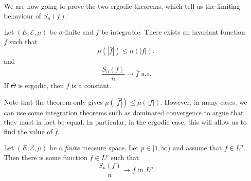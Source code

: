 \documentclass[a4paper]{article}
\begin{document}
We are now going to prove the two ergodic theorems, which tell us the limiting behaviour of $S_n(f)$.

\begin{thm}
  Let $(E, \mathcal{E}, \mu)$ be $\sigma$-finite and $f$ be integrable. There exists an invariant function $\bar{f}$ such that
  \[
    \mu(|\bar{f}|) \leq \mu(|f|),
  \]
  and
  \[
    \frac{S_n(f)}{n} \to \bar{f}\text{ a.e.}
  \]
  If $\Theta$ is ergodic, then $\bar{f}$ is a constant.
\end{thm}
Note that the theorem only gives $\mu(|\bar{f}|) \leq \mu(|f|)$. However, in many cases, we can use some integration theorems such as dominated convergence to argue that they must in fact be equal. In particular, in the ergodic case, this will allow us to find the value of $\bar{f}$.

\begin{thm}
  Let $(E, \mathcal{E}, \mu)$ be a \emph{finite} measure space. Let $p \in [1, \infty)$ and assume that $f \in L^p$. Then there is some function $\bar{f} \in L^p$ such that
  \[
    \frac{S_n(f)}{n} \to \bar{f}\text{ in $L^p$}.
  \]
\end{thm}
\end{document}
